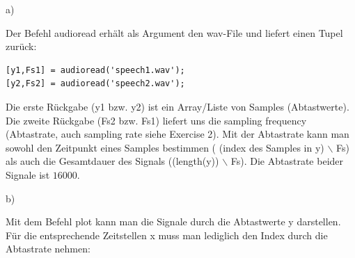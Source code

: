 












a)

Der Befehl audioread erhält als Argument den wav-File und liefert
einen Tupel zurück:

\begin{lstlisting}
[y1,Fs1] = audioread('speech1.wav');
[y2,Fs2] = audioread('speech2.wav');
\end{lstlisting}

Die erste Rückgabe (y1 bzw. y2) ist ein Array/Liste von Samples
(Abtastwerte).  Die zweite Rückgabe (Fs2 bzw. Fs1) liefert uns
die sampling frequency (Abtastrate, auch sampling rate siehe
Exercise 2). Mit der Abtastrate kann man sowohl den Zeitpunkt
eines Samples bestimmen ( (index des Samples in y) $\backslash$
Fs) als auch die Gesamtdauer des Signals ((length(y))
$\backslash$ Fs). Die Abtastrate beider Signale ist $16000$.    

b)

Mit dem Befehl plot kann man die Signale durch die Abtastwerte y darstellen. Für die
entsprechende Zeitstellen x muss man lediglich den Index durch die
Abtastrate nehmen:


